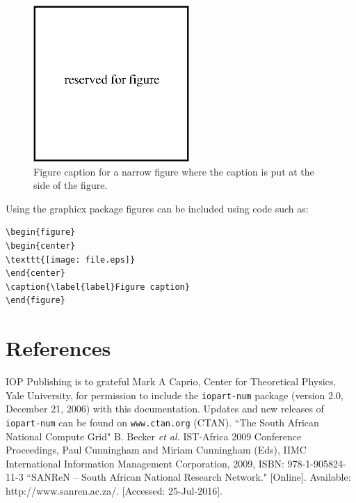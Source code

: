 \documentclass[a4paper]{jpconf}
\begin{document}
\begin{figure}[h]
\includegraphics[width=14pc]{name.eps}\hspace{2pc}%
\begin{minipage}[b]{14pc}\caption{\label{label}Figure caption for a narrow figure where the caption is put at the side of the figure.}
\end{minipage}
\end{figure}

Using the graphicx package figures can be included using code such as:
\begin{verbatim}
\begin{figure}
\begin{center}
\texttt{[image: file.eps]}
\end{center}
\caption{\label{label}Figure caption}
\end{figure}
\end{verbatim}

\section*{References}
\begin{thebibliography}{9}
 IOP Publishing is to grateful Mark A Caprio, Center for Theoretical Physics, Yale University, for permission to include the {\tt iopart-num} \BibTeX package (version 2.0, December 21, 2006) with  this documentation. Updates and new releases of {\tt iopart-num} can be found on \verb"www.ctan.org" (CTAN).
  ``The South African National Compute Grid" B. Becker {\it et al.} IST-Africa 2009 Conference Proceedings, Paul Cunningham and Miriam Cunningham (Eds), IIMC International Information Management Corporation, 2009, ISBN: 978-1-905824-11-3
 ``SANReN – South African National Research Network." [Online]. Available: http://www.sanren.ac.za/. [Accessed: 25-Jul-2016].
\end{thebibliography}

% 
\end{document}
